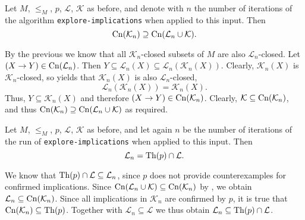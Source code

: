 \begin{Corollary}
  \label{cor:explore-implications-closures-coincide}
  Let $M$, $\leq_M$, $p$, $\mathcal{L}$, $\mathcal{K}$ as before, and denote with $n$ the
  number of iterations of the algorithm \lstinline{explore-implications} when applied to
  this input.  Then
  \begin{equation*}
    \operatorname{Cn}(\mathcal{K}_n) \supseteq \operatorname{Cn}(\mathcal{L}_n \cup \mathcal{K}).
  \end{equation*}
\end{Corollary}
\begin{Proof}
  By the previous  we know that all
  $\mathcal{K}_n$-closed subsets of $M$ are also $\mathcal{L}_n$-closed.  Let $(X \to Y)
  \in \operatorname{Cn}(\mathcal{L}_n)$.  Then $Y \subseteq \mathcal{L}_n(X) \subseteq
  \mathcal{L}_n(\mathcal{K}_n(X))$.  Clearly, $\mathcal{K}_n(X)$ is
  $\mathcal{K}_n$-closed, so  yields
  that $\mathcal{K}_n(X)$ is also $\mathcal{L}_n$-closed, \ie
  \begin{equation*}
    \mathcal{L}_n(\mathcal{K}_n(X)) = \mathcal{K}_n(X).
  \end{equation*}
  Thus, $Y \subseteq \mathcal{K}_n(X)$ and therefore $(X \to Y) \in \operatorname{Cn}(\mathcal{K}_n)$.
  Clearly, $\mathcal{K} \subseteq \operatorname{Cn}(\mathcal{K}_n)$, and thus $\operatorname{Cn}(\mathcal{K}_n)
  \supseteq \operatorname{Cn}(\mathcal{L}_n \cup \mathcal{K})$ as required.
\end{Proof}

\begin{Corollary}
  \label{cor:explore-implications-L_n-exactly-those-confirmed-by-expert}
  Let $M$, $\leq_M$, $p$, $\mathcal{L}$, $\mathcal{K}$ as before, and let again $n$ be
  the number of iterations of the run of \lstinline{explore-implications} when applied to
  this input.  Then
  \begin{equation*}
    \mathcal{L}_n = \operatorname{Th}(p) \cap \mathcal{L}.
  \end{equation*}
\end{Corollary}
\begin{Proof}
  We know that $\operatorname{Th}(p) \cap \mathcal{L} \subseteq \mathcal{L}_{n}$, since $p$ does not
  provide counterexamples for confirmed implications.  Since $\operatorname{Cn}(\mathcal{L}_{n} \cup
  \mathcal{K}) \subseteq \operatorname{Cn}(\mathcal{K}_{n})$ by
  , we obtain $\mathcal{L}_{n} \subseteq
  \operatorname{Cn}(\mathcal{K}_{n})$.  Since all implications in $\mathcal{K}_{n}$ are confirmed by
  $p$, it is true that $\operatorname{Cn}(\mathcal{K}_{n}) \subseteq \operatorname{Th}(p)$.  Together with
  $\mathcal{L}_{n} \subseteq \mathcal{L}$ we thus obtain $\mathcal{L}_{n} \subseteq \operatorname{Th}(p)
  \cap \mathcal{L}$.
\end{Proof}

